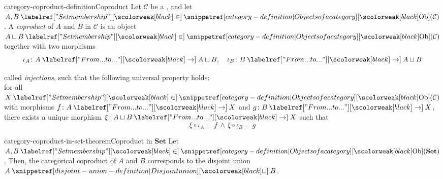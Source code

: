 \documentclass[preview]{standalone}
\begin{document}
\begin{snippetdefinition}{category-coproduct-definition}{Coproduct}
    Let \(\mathcal{C}\) be a \category, and let \(A,B\in \catob(\mathcal{C})\).
    A \emph{coproduct} of \(A\) and \(B\) in \(\mathcal{C}\) is an object \(A \sqcup B \in \catob(\mathcal{C})\)
    together with two morphisms
    \[
        \iota_A \colon A \fromto A \sqcup B, \quad
        \iota_B \colon B \fromto A \sqcup B
    \]
    \begin{minipage}{0.65\textwidth}
        called \emph{injections}, such that the following universal property holds: \\
        for all \(X \in \catob(\mathcal{C})\) with morphisms
        \(f\colon A \fromto X\) and \(g\colon B \fromto X\), there exists a unique morphism
        \(\xi \colon A \sqcup B \fromto X\) such that
        \[
            \xi \circ \iota_A = f \, \land \, \xi \circ \iota_B = g
        \]
    \end{minipage}
    \begin{minipage}{0.35\textwidth}
        \begin{center}
        \end{center}
    \end{minipage}
\end{snippetdefinition}

\begin{snippettheorem}{category-coproduct-in-set-theorem}{Coproduct in \(\mathbf{Set}\)}
    Let \(A,B \in \catob(\mathbf{Set})\). Then,
    the categorical coproduct of \(A\) and \(B\) corresponds to the disjoint union
    \(A \disjointunion B\).
\end{snippettheorem}
\end{document}
